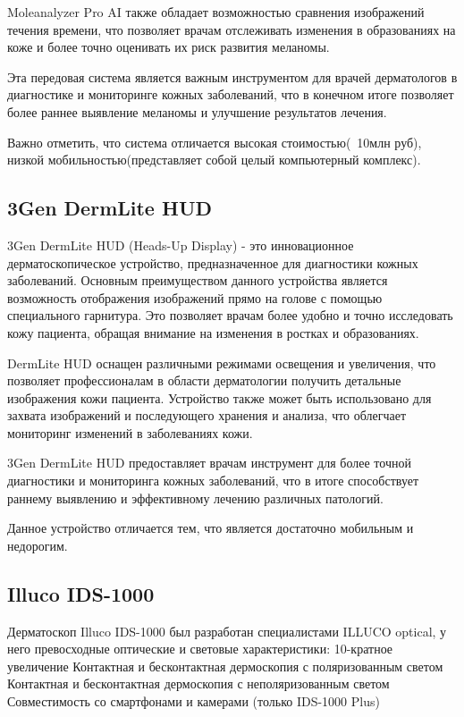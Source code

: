 \begin{sloppypar}
Moleanalyzer Pro AI также обладает возможностью сравнения изображений течения времени, что позволяет врачам отслеживать изменения в образованиях на коже и более точно оценивать их риск развития меланомы.

Эта передовая система является важным инструментом для врачей дерматологов в диагностике и мониторинге кожных заболеваний, что в конечном итоге позволяет более раннее выявление меланомы и улучшение результатов лечения.

Важно отметить, что  система отличается высокая стоимостью(~10млн руб), низкой мобильностью(представляет собой целый компьютерный комплекс).


\subsection{3Gen DermLite HUD}

3Gen DermLite HUD\cite{drmlt} (Heads-Up Display) - это инновационное дерматоскопическое устройство, предназначенное для диагностики кожных заболеваний. Основным преимуществом данного устройства является возможность отображения изображений прямо на голове  с помощью специального гарнитура. Это позволяет врачам более удобно и точно исследовать кожу пациента, обращая внимание на изменения в ростках и образованиях.

DermLite HUD оснащен различными режимами освещения и увеличения, что позволяет профессионалам в области дерматологии получить детальные изображения кожи пациента. Устройство также может быть использовано для захвата изображений и последующего хранения и анализа, что облегчает мониторинг изменений в заболеваниях кожи.

3Gen DermLite HUD предоставляет врачам инструмент для более точной диагностики и мониторинга кожных заболеваний, что в итоге способствует раннему выявлению и эффективному лечению различных патологий.

Данное устройство отличается тем, что является достаточно мобильным и недорогим.



\subsection{Illuco IDS-1000 }
 
Дерматоскоп Illuco IDS-1000  \cite{IDS}  был разработан специалистами ILLUCO optical, у него превосходные оптические и световые характеристики:
10-кратное увеличение
Контактная и бесконтактная дермоскопия с поляризованным светом
Контактная и бесконтактная дермоскопия с неполяризованным светом
Совместимость со смартфонами и камерами (только IDS-1000 Plus)




\end{sloppypar}
